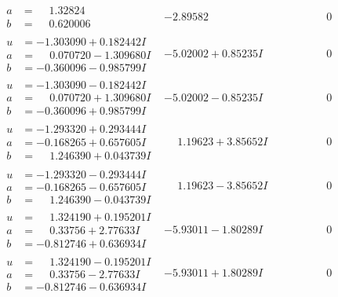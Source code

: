 \documentclass[1p]{elsarticle_modified}
\theoremstyle{definition}
\begin{document}
$$\begin{array}{c|c|c}
\begin{aligned}
a &= \phantom{-}1.32824\phantom{ +0.000000I} \\
b &= \phantom{-}0.620006\phantom{ +0.000000I}\end{aligned}
 & -2.89582\phantom{ +0.000000I} & \phantom{-0.000000 } 0 \\ \hline\begin{aligned}
u &= -1.303090 + 0.182442 I \\
a &= \phantom{-}0.070720 - 1.309680 I \\
b &= -0.360096 - 0.985799 I\end{aligned}
 & -5.02002 + 0.85235 I & \phantom{-0.000000 } 0 \\ \hline\begin{aligned}
u &= -1.303090 - 0.182442 I \\
a &= \phantom{-}0.070720 + 1.309680 I \\
b &= -0.360096 + 0.985799 I\end{aligned}
 & -5.02002 - 0.85235 I & \phantom{-0.000000 } 0 \\ \hline\begin{aligned}
u &= -1.293320 + 0.293444 I \\
a &= -0.168265 + 0.657605 I \\
b &= \phantom{-}1.246390 + 0.043739 I\end{aligned}
 & \phantom{-}1.19623 + 3.85652 I & \phantom{-0.000000 } 0 \\ \hline\begin{aligned}
u &= -1.293320 - 0.293444 I \\
a &= -0.168265 - 0.657605 I \\
b &= \phantom{-}1.246390 - 0.043739 I\end{aligned}
 & \phantom{-}1.19623 - 3.85652 I & \phantom{-0.000000 } 0 \\ \hline\begin{aligned}
u &= \phantom{-}1.324190 + 0.195201 I \\
a &= \phantom{-}0.33756 + 2.77633 I \\
b &= -0.812746 + 0.636934 I\end{aligned}
 & -5.93011 - 1.80289 I & \phantom{-0.000000 } 0 \\ \hline\begin{aligned}
u &= \phantom{-}1.324190 - 0.195201 I \\
a &= \phantom{-}0.33756 - 2.77633 I \\
b &= -0.812746 - 0.636934 I\end{aligned}
 & -5.93011 + 1.80289 I & \phantom{-0.000000 } 0\\

\end{array}$$
\end{document}
